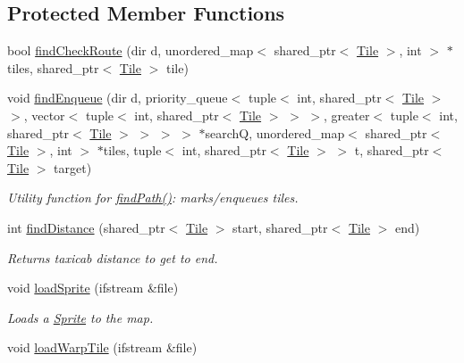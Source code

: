 \subsection*{Protected Member Functions}
\begin{DoxyCompactItemize}
\item 
bool \hyperlink{class_terr_af17a51c8b893a518a743c72411de3598}{find\+Check\+Route} (dir d, unordered\+\_\+map$<$ shared\+\_\+ptr$<$ \hyperlink{class_tile}{Tile} $>$, int $>$ $\ast$tiles, shared\+\_\+ptr$<$ \hyperlink{class_tile}{Tile} $>$ tile)
\item 
void \hyperlink{class_terr_a80d2b5befbfc30d4d38a4dd2ade6b7bf}{find\+Enqueue} (dir d, priority\+\_\+queue$<$ tuple$<$ int, shared\+\_\+ptr$<$ \hyperlink{class_tile}{Tile} $>$ $>$, vector$<$ tuple$<$ int, shared\+\_\+ptr$<$ \hyperlink{class_tile}{Tile} $>$ $>$ $>$, greater$<$ tuple$<$ int, shared\+\_\+ptr$<$ \hyperlink{class_tile}{Tile} $>$ $>$ $>$ $>$ $\ast$searchQ, unordered\+\_\+map$<$ shared\+\_\+ptr$<$ \hyperlink{class_tile}{Tile} $>$, int $>$ $\ast$tiles, tuple$<$ int, shared\+\_\+ptr$<$ \hyperlink{class_tile}{Tile} $>$ $>$ t, shared\+\_\+ptr$<$ \hyperlink{class_tile}{Tile} $>$ target)\hypertarget{class_terr_a80d2b5befbfc30d4d38a4dd2ade6b7bf}{}\label{class_terr_a80d2b5befbfc30d4d38a4dd2ade6b7bf}

\begin{DoxyCompactList}\small\item\em Utility function for \hyperlink{class_terr_ad0596843b8e4c1ddd9b39220837b88ce}{find\+Path()}\+: marks/enqueues tiles. \end{DoxyCompactList}\item 
int \hyperlink{class_terr_a76e437b2864d6fd78b85961dbe1ade61}{find\+Distance} (shared\+\_\+ptr$<$ \hyperlink{class_tile}{Tile} $>$ start, shared\+\_\+ptr$<$ \hyperlink{class_tile}{Tile} $>$ end)\hypertarget{class_terr_a76e437b2864d6fd78b85961dbe1ade61}{}\label{class_terr_a76e437b2864d6fd78b85961dbe1ade61}

\begin{DoxyCompactList}\small\item\em Returns taxicab distance to get to end. \end{DoxyCompactList}\item 
void \hyperlink{class_terr_ac552835680026b818b202e40664ca25a}{load\+Sprite} (ifstream \&file)\hypertarget{class_terr_ac552835680026b818b202e40664ca25a}{}\label{class_terr_ac552835680026b818b202e40664ca25a}

\begin{DoxyCompactList}\small\item\em Loads a \hyperlink{class_sprite}{Sprite} to the map. \end{DoxyCompactList}\item 
void \hyperlink{class_terr_ade4dc4c2e3c5746d7274ff7849b60e38}{load\+Warp\+Tile} (ifstream \&file)\hypertarget{class_terr_ade4dc4c2e3c5746d7274ff7849b60e38}{}\label{class_terr_ade4dc4c2e3c5746d7274ff7849b60e38}


\end{DoxyCompactItemize}
